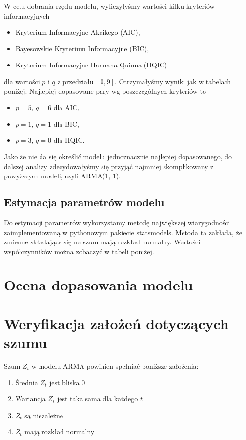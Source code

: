 \documentclass{article}
\theoremstyle{break}
\begin{document}
	W celu dobrania rzędu modelu, wyliczyłyśmy wartości kilku kryteriów informacyjnych
	\begin{itemize}
		\item Kryterium Informacyjne Akaikego (AIC),
		\item Bayesowskie Kryterium Informacyjne (BIC),
		\item Kryterium Informacyjne Hannana-Quinna (HQIC)
	\end{itemize}
	dla wartości $p$ i $q$ z przedziału $[0, 9]$. Otrzymałyśmy wyniki jak w tabelach poniżej. Najlepiej dopasowane pary wg poszczególnych kryteriów to
	\begin{itemize}
		\item $p=5$, $q=6$ dla AIC,
		\item $p=1$, $q=1$ dla BIC,
		\item $p=3$, $q=0$ dla HQIC.
	\end{itemize}
	Jako że nie da się określić modelu jednoznacznie najlepiej dopasowanego, 
	do dalszej analizy zdecydowałyśmy się przyjąć najmniej skomplikowany z powyższych modeli, czyli ARMA(1, 1).
	
	\subsection{Estymacja parametrów modelu}
	
	Do estymacji parametrów wykorzystamy metodę największej wiarygodności zaimplementowaną w pythonowym pakiecie statsmodels. Metoda ta zakłada, że zmienne składające się na szum mają rozkład normalny. Wartości współczynników można zobaczyć w tabeli poniżej.
	
	\section{Ocena dopasowania modelu}
	
	\section{Weryfikacja założeń dotyczących szumu}
	
	Szum ${Z_t}$ w modelu ARMA powinien spełniać poniższe założenia:
	\begin{enumerate}
		\item Średnia ${Z_t}$ jest bliska 0
		\item Wariancja ${Z_t}$ jest taka sama dla każdego $t$
		\item ${Z_t}$ są niezależne
		\item ${Z_t}$ mają rozkład normalny
	\end{enumerate}
	
\end{document}
